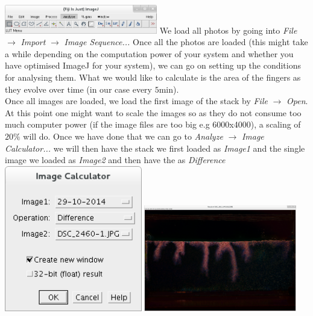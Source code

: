 \documentclass[twoside]{article}
\begin{document}
\begin{multicols}{2}
\includegraphics[width=0.5\textwidth]{imagej.png}\label{fig:imagej}
\vspace{0.3cm}
We load all photos by going into \textit{File}$\longrightarrow$ \textit{Import} $\longrightarrow$ \textit{Image Sequence...}
Once all the photos are loaded (this might take a while depending on the computation power of your system and whether you have optimised ImageJ for your system), we can go on setting up the conditions for analysing them. What we would like to calculate is the area of the fingers as they evolve over time (in our case every $5$min).\\ 
Once all images are loaded, we load the first image of the stack by \textit{File} $\longrightarrow$ \textit{Open}. At this point one might want to scale the images so as they do not consume too much computer power (if the image files are too big e.g 6000x4000), a scaling of $20\%$ will do. Once we have done that we can go to \textit{Analyze} $\longrightarrow$ \textit{Image Calculator...} we will then have the stack we first loaded as \textit{Image1} and the single image we loaded as \textit{Image2} and then have the  as \textit{Difference}\\

\includegraphics[width=0.45\textwidth]{diffmenu.png}\label{fig:diffmenu}
\vspace{0.3cm}
\includegraphics[width=0.5\textwidth]{diff.png}\label{fig:diff}
\vspace{0.3cm}


\end{multicols}
\end{document}
